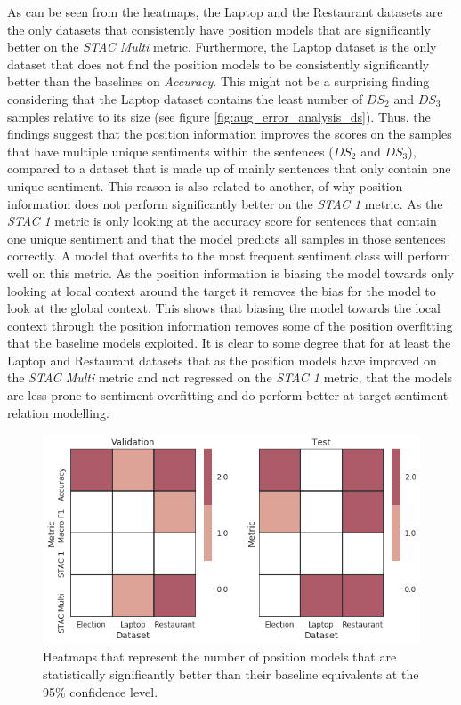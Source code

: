 As can be seen from the heatmaps, the Laptop and the Restaurant datasets are the only datasets that consistently have position models that are significantly better on the \textit{STAC Multi} metric. Furthermore, the Laptop dataset is the only dataset that does not find the position models to be consistently significantly better than the baselines on \textit{Accuracy}. This might not be a surprising finding considering that the Laptop dataset contains the least number of $DS_2$ and $DS_3$ samples relative to its size (see figure \ref{fig:aug_error_analysis_ds}). Thus, the findings suggest that the position information improves the scores on the samples that have multiple unique sentiments within the sentences ($DS_2$ and $DS_3$), compared to a dataset that is made up of mainly sentences that only contain one unique sentiment. This reason is also related to another, of why position information does not perform significantly better on the \textit{STAC 1} metric. As the \textit{STAC 1} metric is only looking at the accuracy score for sentences that contain one unique sentiment and that the model predicts all samples in those sentences correctly. A model that overfits to the most frequent sentiment class will perform well on this metric. As the position information is biasing the model towards only looking at local context around the target it removes the bias for the model to look at the global context. This shows that biasing the model towards the local context through the position information removes some of the position overfitting that the baseline models exploited. It is clear to some degree that for at least the Laptop and Restaurant datasets that as the position models have improved on the \textit{STAC Multi} metric and not regressed on the \textit{STAC 1} metric, that the models are less prone to sentiment overfitting and do perform better at target sentiment relation modelling.

\begin{figure}[h!]
    \centering
    \includegraphics[scale=0.5]{images/augmentation/methods_performance/Position_Encoding/position_overall_sig_models.png}
    \caption{Heatmaps that represent the number of position models that are statistically significantly better than their baseline equivalents at the 95\% confidence level.}
    \label{fig:aug_position_overall_sig_models}
\end{figure}

